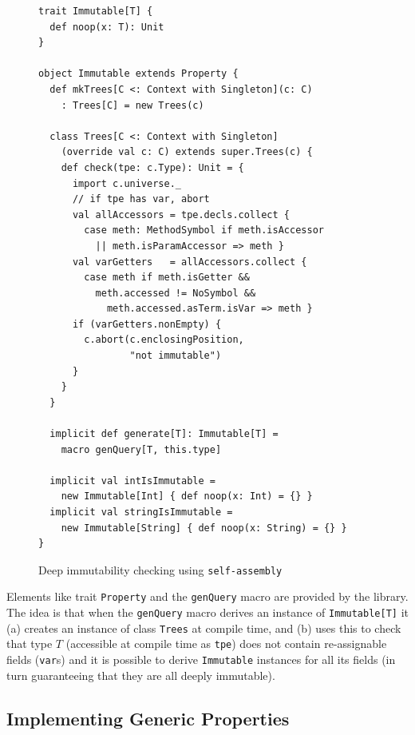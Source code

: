\documentclass[preprint]{sigplanconf}
\newcommand{\selfassembly}{\texttt{self-assembly~}}
\begin{document}

\begin{figure}
\centering
\begin{lstlisting}
trait Immutable[T] {
  def noop(x: T): Unit
}

object Immutable extends Property {
  def mkTrees[C <: Context with Singleton](c: C)
    : Trees[C] = new Trees(c)

  class Trees[C <: Context with Singleton]
    (override val c: C) extends super.Trees(c) {
    def check(tpe: c.Type): Unit = {
      import c.universe._
      // if tpe has var, abort
      val allAccessors = tpe.decls.collect {
        case meth: MethodSymbol if meth.isAccessor
          || meth.isParamAccessor => meth }
      val varGetters   = allAccessors.collect {
        case meth if meth.isGetter &&
          meth.accessed != NoSymbol &&
            meth.accessed.asTerm.isVar => meth }
      if (varGetters.nonEmpty) {
        c.abort(c.enclosingPosition,
                "not immutable")
      }
    }
  }

  implicit def generate[T]: Immutable[T] =
    macro genQuery[T, this.type]

  implicit val intIsImmutable =
    new Immutable[Int] { def noop(x: Int) = {} }
  implicit val stringIsImmutable =
    new Immutable[String] { def noop(x: String) = {} }
}
\end{lstlisting}
  \caption{Deep immutability checking using \selfassembly}
  \label{fig:immutable}
\end{figure}

Elements like trait \verb|Property| and the \verb|genQuery| macro are provided
by the library. The idea is that when the \verb|genQuery| macro derives an
instance of \verb|Immutable[T]| it (a) creates an instance of class
\verb|Trees| at compile time, and (b) uses this to check that type $T$
(accessible at compile time as \verb|tpe|) does not contain re-assignable
fields (\verb|var|s) and it is possible to derive \verb|Immutable| instances
for all its fields (in turn guaranteeing that they are all deeply immutable).


\subsection{Implementing Generic Properties}\label{sec:genprop-implementation}
\end{document}
